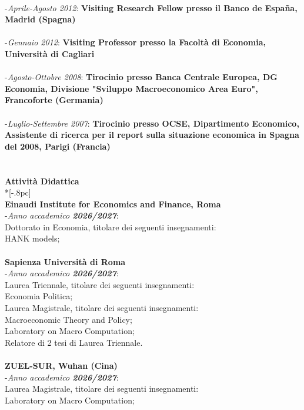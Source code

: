 \documentclass[10p]{article}
\begin{document}
\\
-\emph{Aprile-Agosto 2012}: {\bf Visiting Research Fellow presso il Banco de Espa\~{n}a, Madrid (Spagna)} \\
\\
-\emph{Gennaio 2012}: {\bf Visiting Professor presso la Facolt\`a di Economia, Universit\`a  di Cagliari} \\
\\
-\emph{Agosto-Ottobre 2008}: {\bf Tirocinio presso Banca Centrale Europea, DG Economia, Divisione "Sviluppo Macroeconomico Area Euro", Francoforte (Germania)}\\
\\
-\emph{Luglio-Settembre 2007}: {\bf Tirocinio presso OCSE, Dipartimento Economico, Assistente di ricerca per il report sulla situazione economica in Spagna del 2008, Parigi (Francia)}\\
\\
\\
{\large \bf Attivit\`a Didattica } \\*[-.8pc]
\underline{\hspace{6in}} \\
{\bf Einaudi Institute for Economics and Finance, Roma}\\
-\emph{Anno accademico \textbf{2026/2027}}: \\
Dottorato in Economia, titolare dei seguenti insegnamenti:\\
HANK models;\\
\\
{\bf Sapienza Universit\`{a} di Roma}\\
-\emph{Anno accademico \textbf{2026/2027}}: \\
Laurea Triennale, titolare dei seguenti insegnamenti:\\
Economia Politica;\\
Laurea Magistrale, titolare dei seguenti insegnamenti:\\
Macroeconomic Theory and Policy;\\
Laboratory on Macro Computation;\\
Relatore di 2 tesi di Laurea Triennale.\\
\\
{\bf ZUEL-SUR, Wuhan (Cina)}\\
-\emph{Anno accademico \textbf{2026/2027}}: \\
Laurea Magistrale, titolare dei seguenti insegnamenti:\\
Laboratory on Macro Computation;\\
\\
\end{document}

